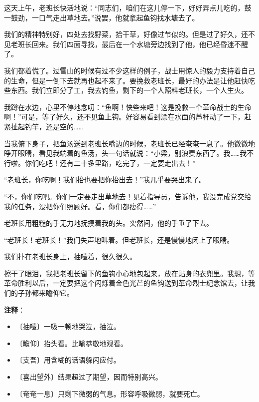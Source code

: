 \documentclass[12pt,UTF-8,openany]{ctexbook}
\begin{document}
\begin{Large}
    这天上午，老班长快活地说：“同志们，咱们在这儿停一下，好好弄点儿吃的，鼓一鼓劲，一口气走出草地去。”说罢，他就拿起鱼钩找水塘去了。
    
    我们的精神特别好，四处去找野菜，拾干草，好像过节似的。但是过了好久，还不见老班长回来。我们四面寻找，最后在一个水塘旁边找到了他，他已经昏迷不醒了。
    
    我们都着慌了。过雪山的时候有过不少这样的例子，战士用惊人的毅力支持着自己的生命，但是一倒下去就再也起不来了。要挽救老班长，最好的办法是让他赶快吃些东西。我们立即分了工，我去钓鱼，剩下的一个人照料老班长，一个人生火。
    
    我蹲在水边，心里不停地念叨：“鱼啊！快些来吧！这是挽救一个革命战士的生命啊！”可是，等了好久，还不见鱼上钩。好容易看到漂在水面的芦秆动了一下，赶紧扯起钓竿，还是空的……
    
    当我俯下身子，把鱼汤送到老班长嘴边的时候，老班长已经奄奄一息了。他微微地睁开眼睛，看见我端着的鱼汤，头一句话就说：“小梁，别浪费东西了。我……我不行啦。你们吃吧！还有二十多里路，吃完了，一定要走出去！”
    
    “老班长，你吃啊！我们抬也要把你抬出去！”我几乎要哭出来了。
    
    “不，你们吃吧。你们一定要走出草地去！见着指导员，告诉他，我没完成党交给我的任务，没把你们照顾好。看，你们都瘦得……”
    
    老班长用粗糙的手无力地抚摸着我的头。突然间，他的手垂了下去。
    
    “老班长！老班长！”我们失声地叫着。但老班长，还是慢慢地闭上了眼睛。
    
    我们扑在老班长身上，抽噎着，很久很久。
    
    擦干了眼泪，我把老班长留下的鱼钩小心地包起来，放在贴身的衣兜里。我想，等革命胜利以后，一定要把这个闪烁着金色光芒的鱼钩送到革命烈士纪念馆去，让我们的子孙都来瞻仰它。
    
\end{Large}


\newpage

\textbf{注释}：

\vspace{-1em}

\begin{itemize}
    \setlength\itemsep{-0.2em}
    \item 〔抽噎〕一吸一顿地哭泣，抽泣。
    \item 〔瞻仰〕抬头看。比喻恭敬地观看。
    \item 〔支吾〕用含糊的话语躲闪应付。
    \item 〔喜出望外〕结果超过了期望，因而特别高兴。
    \item 〔奄奄一息〕只剩下微弱的气息。形容呼吸微弱，就要死亡。
\end{itemize}
\end{document}
